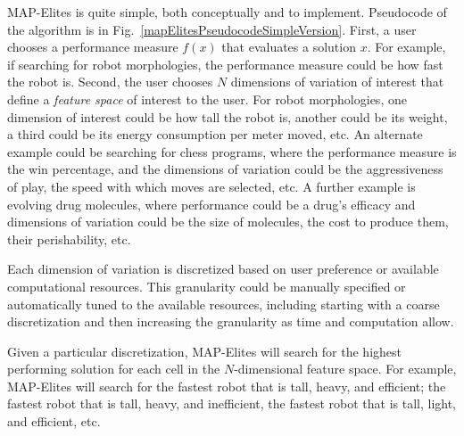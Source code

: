 \documentclass[twocolumn, DIV25, 9pt]{scrartcl}
\newcommand{\todoOfficialVersion}[1]{} %
\begin{document}
MAP-Elites is quite simple, both conceptually and to implement. Pseudocode of the algorithm is in Fig.~\ref{mapElitesPseudocodeSimpleVersion}. First, a user chooses a performance measure $f(x)$ that evaluates a solution $x$. For example, if searching for robot morphologies, the performance measure could be how fast the robot is. Second, the user chooses $N$ dimensions of variation of interest that define a \emph{feature space} of interest to the user. For robot morphologies, one dimension of interest could be how tall the robot is, another could be its weight, a third could be its energy consumption per meter moved, etc. An alternate example could be searching for chess programs, where the performance measure is the win percentage, and the dimensions of variation could be the aggressiveness of play, the speed with which moves are selected, etc. A further example is evolving drug molecules, where performance could be a drug's efficacy and dimensions of variation could be the size of molecules, the cost to produce them, their perishability, etc. 

\todoOfficialVersion{Maybe somewhere in the paper, we should advise more specifically how to choose the dimensions.. E.g.

1. Choose dimensions as how you want to explore the search space.

2. Choose dimensions as to create best gradients that lead to desired solutions.}
Each dimension of variation is discretized based on user preference or available computational resources. This granularity could be manually specified or automatically tuned to the available resources, including starting with a coarse discretization and then increasing the granularity as time and computation allow. 

Given a particular discretization, MAP-Elites will search for the highest performing solution for each cell in the $N$-dimensional feature space. For example, MAP-Elites will search for the fastest robot that is tall, heavy, and efficient; the fastest robot that is tall, heavy, and inefficient, the fastest robot that is tall, light, and efficient, etc. 
\end{document}

